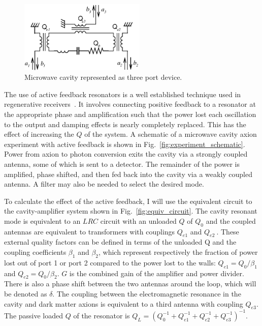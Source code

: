 \documentclass[aps,prl,twocolumn,groupedaddress]{revtex4-1}
\begin{document}
\begin{figure}
\includegraphics[width=6cm]{figs/amplitude_definitions.eps}
\caption{\label{fig:amplitude_defs} Microwave cavity represented as three port device.}
\end{figure}

The use of active feedback resonators is a well established technique used in regenerative receivers~\cite{armstrong1914wireless}.
It involves connecting positive feedback to a resonator at the appropriate phase and amplification such that the power lost each oscillation to the output and damping effects is nearly completely replaced.  
This has the effect of increasing the $Q$ of the system.
A schematic of a microwave cavity axion experiment with active feedback is shown in Fig.~\ref{fig:experiment_schematic}.   Power from axion to photon conversion exits the cavity via a strongly coupled antenna, some of which is sent to a detector.  The remainder of the power is amplified, phase shifted, and then fed back into the cavity via a weakly coupled antenna.  A filter may also be needed to select the desired mode. 

To calculate the effect of the active feedback, I will use the equivalent circuit to the cavity-amplifier system shown in Fig.~\ref{fig:equiv_circuit}.  The cavity resonant mode is equivalent to an $LRC$ circuit with an unloaded $Q$ of $Q_0$ and the coupled antennas are equivalent to transformers with couplings $Q_{e1}$ and $Q_{e2}~$\cite{Montgomery:1948}.  These external quality factors can be defined in terms of the unloaded Q and the coupling coefficients $\beta_1$ and $\beta_2$, which represent respectively the fraction of power lost out of port 1 or port 2 compared to the power lost to the walls: $Q_{e1} = Q_0/\beta_1$ and $Q_{e2} = Q_0/\beta_2$. $G$ is the combined gain of the amplifier and power divider.  There is also a phase shift between the two antennas around the loop, which will be denoted as $\delta$.  The coupling between the electromagnetic resonance in the cavity and dark matter axions is equivalent to a third antenna with coupling $Q_{e3}$.  The passive loaded $Q$ of the resonator is $Q_L=\left(Q_0^{-1}+Q_{e1}^{-1}+Q_{e2}^{-1}+Q_{e3}^{-1}\right)^{-1}$.
\end{document}
